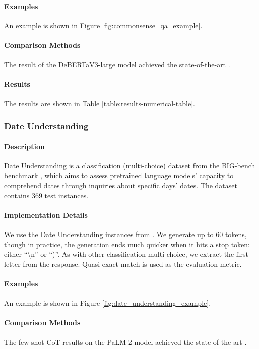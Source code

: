 \paragraph{Examples} An example is shown in Figure \ref{fig:commonsense_qa_example}.

\paragraph{Comparison Methods}
The result of the DeBERTaV3-large model achieved the state-of-the-art \citep{xu2022human}.

\paragraph{Results} The results are shown in Table \ref{table:results-numerical-table}.

\subsubsection{Date Understanding}
\paragraph{Description} Date Understanding \citep{srivastava2023imitation,suzgun2022challenging} is a classification (multi-choice) dataset from the BIG-bench benchmark \citep{srivastava2023imitation}, which aims to assess pretrained language models' capacity to comprehend dates through inquiries about specific days' dates. The dataset contains 369 test instances.

\paragraph{Implementation Details}
We use the Date Understanding instances from \citet{suzgun2022challenging}. We generate up to 60 tokens, though in practice, the generation ends much quicker when it hits a stop token: either ``\textbackslash n'' or ``)''. As with other classification multi-choice, we extract the first letter from the response. Quasi-exact match is used as the evaluation metric.

\paragraph{Examples} An example is shown in Figure \ref{fig:date_understanding_example}.

\paragraph{Comparison Methods}
The few-shot CoT results on the PaLM 2 model achieved the state-of-the-art \citep{anil2023palm}.


